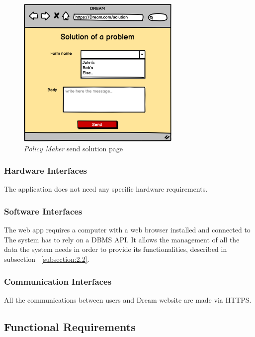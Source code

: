 \begin{figure}[H]
    \begin{center}
    \includegraphics[width=0.7\textwidth]{mockups/Solution.png}
    \caption{\emph{Policy Maker} send solution page}
    \label{fig:PMsolution}
    \end{center}
\end{figure}

\subsubsection{Hardware Interfaces}
The application does not need any specific hardware requirements. 

\subsubsection{Software Interfaces}
The web app requires a computer with a web browser installed and connected to 
The system has to rely on a DBMS API. It allows the management of all the data the system 
needs in order to provide its functionalities, described in subsection ~\ref{subsection:2.2}.

\subsubsection{Communication Interfaces}
All the communications between users and Dream website are made via HTTPS.

\newpage

\subsection{Functional Requirements}
